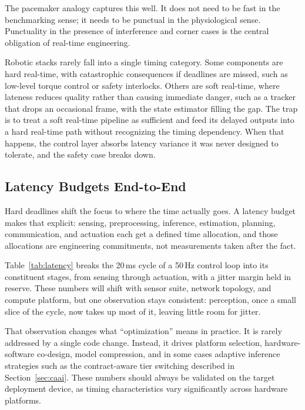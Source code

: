 \documentclass[smallextended]{svjour3}
\begin{document}
The pacemaker analogy captures this well. It does not need to be fast in the benchmarking sense; it needs to be punctual in the physiological sense. Punctuality in the presence of interference and corner cases is the central obligation of real-time engineering.

Robotic stacks rarely fall into a single timing category. Some components are hard real-time, with catastrophic consequences if deadlines are missed, such as low-level torque control or safety interlocks. Others are soft real-time, where lateness reduces quality rather than causing immediate danger, such as a tracker that drops an occasional frame, with the state estimator filling the gap. The trap is to treat a soft real-time pipeline as sufficient and feed its delayed outputs into a hard real-time path without recognizing the timing dependency. When that happens, the control layer absorbs latency variance it was never designed to tolerate, and the safety case breaks down.

\subsection{Latency Budgets End-to-End}

Hard deadlines shift the focus to where the time actually goes. A latency budget makes that explicit: sensing, preprocessing, inference, estimation, planning, communication, and actuation each get a defined time allocation, and those allocations are engineering commitments, not measurements taken after the fact.

Table~\ref{tab:latency} breaks the 20\,ms cycle of a 50\,Hz control loop into its constituent stages, from sensing through actuation, with a jitter margin held in reserve. These numbers will shift with sensor suite, network topology, and compute platform, but one observation stays consistent: perception, once a small slice of the cycle, now takes up most of it, leaving little room for jitter.

That observation changes what ``optimization'' means in practice. It is rarely addressed by a single code change. Instead, it drives platform selection, hardware-software co-design, model compression, and in some cases adaptive inference strategies such as the contract-aware tier switching described in Section~\ref{sec:caai}. These numbers should always be validated on the target deployment device, as timing characteristics vary significantly across hardware platforms.
\end{document}
